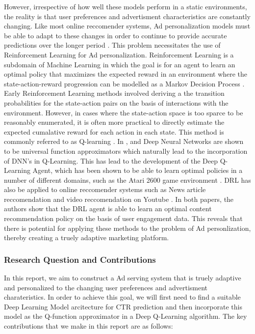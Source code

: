 \documentclass{mldsmsc}
\begin{document}
However, irrespective of how well these models perform in a static environments, the reality is that user preferences
and advertisment characteristics are constantly changing. Like most online reccomender systems,
Ad personalization models must be able to adapt to these changes in order to continue to provide accurate predictions 
over the longer period \citep{RefWorks:zheng2018drn:}. This problem necessitates the use
of Reinforcement Learning for Ad personalization.
Reinforcement Learning is a subdomain of Machine Learning in which the goal is for an agent to
learn an optimal policy that maximizes the expected reward in an environment where the
state-action-reward progression can be modelled as a Markov Decision Process
\citep{puterman2014markov}. Early Reinforcement Learning methods involved 
deriving a the transition probabilities for the state-action pairs on the basis of interactions
with the environment. However, in cases where the state-action space is too sparce to be
reasonably enumerated, it is often more practical 
to directly estimate the expected cumalative reward for each action in each state. This method
is commonly referred to as Q-learning \citep{RefWorks:watkins1989learning}. In \citep{RefWorks:hornik1989multilayer},
\citep{RefWorks:cybenko1989approximation} and \citep{RefWorks:hornik1990universal} Deep
Neural Networks are shown to be universal function approximators
which naturally lead to the incorporation of DNN's in Q-Learning. This has lead to the
development of the Deep Q-Learning Agent, which has been shown to be able to learn optimal
policies in a number of different domains, such as the Atari 2600 game environment \cite{RefWorks:mnih2015human-level}.
DRL has also be applied to online reccomender systems
such as News article reccomendation \citep{RefWorks:zheng2018drn:} and video
reccomendation on Youtube \citep{RefWorks:chen2019top-k}. In both papers,
the authors show that the DRL agent is able to learn an optimal content recommendation
policy on the basis of user engagement data. This reveals that there is potential
for applying these methods to the problem of Ad personlization, thereby creating a 
truely adaptive marketing platform.

\subsubsection{Research Question and Contributions}

In this report, we aim to construct a Ad serving system that is truely adaptive and 
personalized to the changing user preferences and advertisment charateristics. In order
to achieve this goal, we will first need to find a suitable Deep Learning Model arcitecture
for CTR prediction and then incorporate this model as the Q-function approximator in
a Deep Q-Learning algorithm. The key contributions that we make in this report are as follows:
\end{document}
